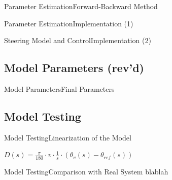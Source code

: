\begin{frame}{Parameter Estimation}{Forward-Backward Method}
    \begin{figure}[H]
    \centering
  \end{figure}
\end{frame}

\begin{frame}{Parameter Estimation}{Implementation (1)}
  \begin{figure}[H]
      \centering
  \end{figure}
\end{frame}

\begin{frame}{Steering Model and Control}{Implementation (2)}
  \begin{figure}[H]
    \centering
  \end{figure}
\end{frame}

\subsection{Model Parameters (rev'd)}

\begin{frame}{Model Parameters}{Final Parameters}
  \begin{minipage}{\linewidth}
    \begin{minipage}{0.35\linewidth}
      \begin{figure}[H]
        \centering
      \end{figure}
    \end{minipage}
    \hspace{0.03\linewidth}
    \begin{minipage}{0.45\linewidth}
      \begin{figure}[H]
        \centering
      \end{figure}
    \end{minipage}
  \end{minipage}
\end{frame}
\subsection{Model Testing}
\begin{frame}{Model Testing}{Linearization of the Model}

  $ D(s)= \frac{\pi}{180} \cdot v \cdot \frac{1}{s} \cdot \left(\theta_{v}(s) - \theta_{ref}(s)\right) $

  \begin{figure}[H]
    \centering
  \end{figure}
\end{frame}

\begin{frame}{Model Testing}{Comparison with Real System}
  blablah
\end{frame}